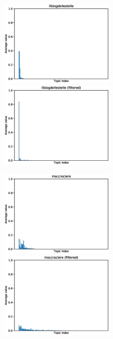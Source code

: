 \begin{figure}[ht]
    \centering
    \includegraphics[width=0.5\textwidth]{images/similarity_graphs/non-filtered/ilblogdellestelle.eps}%
    \hfill
    \includegraphics[width=0.5\textwidth]{images/similarity_graphs/filtered/ilblogdellestelle.eps}
\end{figure}

\pagebreak
\begin{figure}[ht]
    \centering
    \includegraphics[width=0.5\textwidth]{images/similarity_graphs/non-filtered/msccrociere.eps}%
    \hfill
    \includegraphics[width=0.5\textwidth]{images/similarity_graphs/filtered/msccrociere.eps}
\end{figure}

